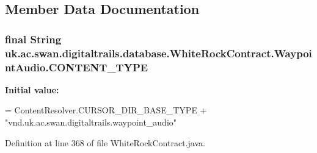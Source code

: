 \subsection{Member Data Documentation}
\hypertarget{classuk_1_1ac_1_1swan_1_1digitaltrails_1_1database_1_1_white_rock_contract_1_1_waypoint_audio_ac3e337a4c430e4fd3e978f695e466d70}{
\subsubsection[{C\+O\+N\+T\+E\+N\+T\+\_\+\+T\+Y\+P\+E}]{\setlength{\rightskip}{0pt plus 5cm}final String uk.\+ac.\+swan.\+digitaltrails.\+database.\+White\+Rock\+Contract.\+Waypoint\+Audio.\+C\+O\+N\+T\+E\+N\+T\+\_\+\+T\+Y\+P\+E\hspace{0.3cm}{\ttfamily [static]}}}\label{classuk_1_1ac_1_1swan_1_1digitaltrails_1_1database_1_1_white_rock_contract_1_1_waypoint_audio_ac3e337a4c430e4fd3e978f695e466d70}
{\bfseries Initial value\+:}
\begin{DoxyCode}
= ContentResolver.CURSOR\_DIR\_BASE\_TYPE +
                \textcolor{stringliteral}{"vnd.uk.ac.swan.digitaltrails.waypoint\_audio"}
\end{DoxyCode}


Definition at line 368 of file White\+Rock\+Contract.\+java.

